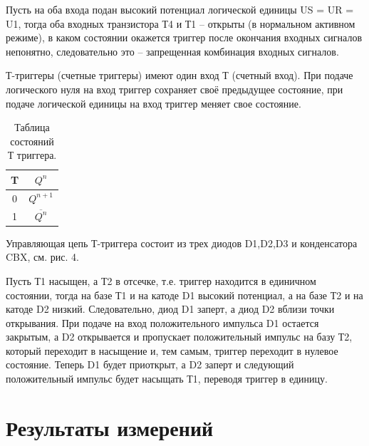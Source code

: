\documentclass[a4paper,14pt]{article}
\begin{document}
Пусть на оба входа подан высокий потенциал логической единицы US = UR = U1, тогда
оба входных транзистора Т4 и Т1 – открыты (в нормальном активном режиме), в каком
состоянии окажется триггер после окончания входных сигналов непонятно, следовательно
это – запрещенная комбинация входных сигналов.

Т-триггеры (счетные триггеры) имеют один вход Т (счетный вход). При подаче
логического нуля на вход триггер сохраняет своё предыдущее состояние, при подаче
логической единицы на вход триггер меняет свое состояние.

\begin{table}[H]
	\centering
	\caption{Таблица состояний Т триггера.}
	\begin{tabular}{|c|c|}
		\hline
		T & $Q^{n}$  \\ \hline
		0 & $Q^{n+1}$  \\ \hline
		1 & $\overline{Q^{n}}$ \\ \hline
	\end{tabular}
\end{table}

Управляющая цепь Т-триггера состоит из трех диодов D1,D2,D3 и конденсатора CBX,
см. рис. 4.

Пусть Т1 насыщен, а Т2 в отсечке, т.е. триггер находится в единичном состоянии,
тогда на базе Т1 и на катоде D1 высокий потенциал, а на базе Т2 и на катоде D2 низкий.
Следовательно, диод D1 заперт, а диод D2 вблизи точки открывания. При подаче на вход
положительного импульса D1 остается закрытым, а D2 открывается и пропускает
положительный импульс на базу Т2, который переходит в насыщение и, тем самым, триггер
переходит в нулевое состояние. Теперь D1 будет приоткрыт, а D2 заперт и следующий
положительный импульс будет насыщать Т1, переводя триггер в единицу.

\section{Результаты измерений}
\end{document}

